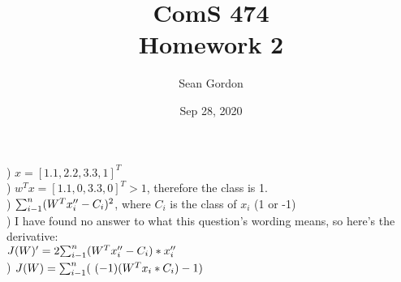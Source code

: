 \documentclass[12pt]{article}
\title{ComS 474\\Homework 2}
\author{Sean Gordon}
\date{Sep 28, 2020}
\begin{document}
\maketitle



) $x = [1.1, 2.2, 3.3, 1]^T$\\


) $w^Tx = [1.1, 0, 3.3, 0]^T > 1$, therefore the class is 1.\\


) ${\large \sum_{i-1}^{n}}(W^Tx_i'' - C_i)^2$, where $C_i$ is the class of $x_i$ (1 or -1)\\


) I have found no answer to what this question's wording means, so here's the derivative:\\
$J(W)' = 2{\large \sum_{i-1}^{n}}(W^Tx_i'' - C_i)*x_i''$\\


)  $J(W) = {\large \sum_{i-1}^{n}}(\ (-1)(W^Tx_i*C_i) - 1)$\\

\end{document}
